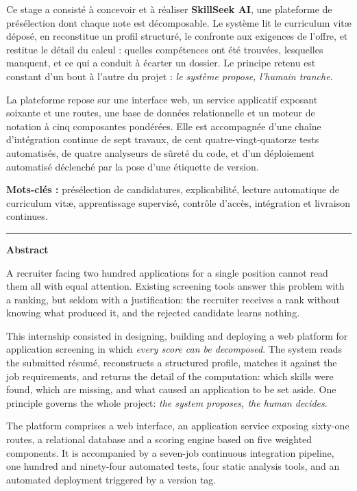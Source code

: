 \documentclass[12pt,a4paper]{report}
\begin{document}
Ce stage a consisté à concevoir et à réaliser \textbf{SkillSeek AI}, une
plateforme de présélection dont chaque note est décomposable. Le système lit
le curriculum vitæ déposé, en reconstitue un profil structuré, le confronte
aux exigences de l'offre, et restitue le détail du calcul : quelles
compétences ont été trouvées, lesquelles manquent, et ce qui a conduit à
écarter un dossier. Le principe retenu est constant d'un bout à l'autre du
projet : \emph{le système propose, l'humain tranche}.

La plateforme repose sur une interface web, un service applicatif exposant
soixante et une routes, une base de données relationnelle et un moteur de
notation à cinq composantes pondérées. Elle est accompagnée d'une chaîne
d'intégration continue de sept travaux, de cent quatre-vingt-quatorze tests
automatisés, de quatre analyseurs de sûreté du code, et d'un déploiement
automatisé déclenché par la pose d'une étiquette de version.

\vspace{0.4cm}
\noindent\textbf{Mots-clés :} présélection de candidatures, explicabilité,
lecture automatique de curriculum vit\ae{}, apprentissage supervisé, contrôle
d'accès, intégration et livraison continues.

\vspace{0.9cm}
\noindent\rule{\textwidth}{0.4pt}
\vspace{0.5cm}

\begingroup
\noindent\textbf{\large Abstract}
\vspace{0.3cm}

A recruiter facing two hundred applications for a single position cannot read
them all with equal attention. Existing screening tools answer this problem
with a ranking, but seldom with a justification: the recruiter receives a rank
without knowing what produced it, and the rejected candidate learns nothing.

This internship consisted in designing, building and deploying a web platform
for application screening in which \emph{every score can be decomposed}. The
system reads the submitted résumé, reconstructs a structured profile, matches
it against the job requirements, and returns the detail of the computation:
which skills were found, which are missing, and what caused an application to
be set aside. One principle governs the whole project: \emph{the system
proposes, the human decides}.

The platform comprises a web interface, an application service exposing
sixty-one routes, a relational database and a scoring engine based on five
weighted components. It is accompanied by a seven-job continuous integration
pipeline, one hundred and ninety-four automated tests, four static analysis
tools, and an automated deployment triggered by a version tag.
\end{document}
